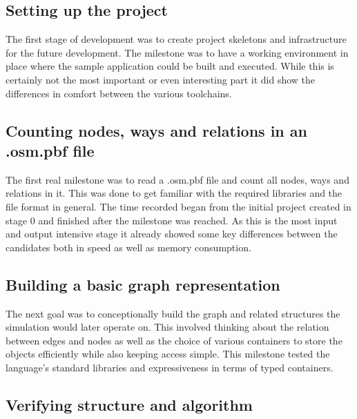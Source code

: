 \setcounter{subsection}{-1}

\subsection{Setting up the project}
\label{subsec:Approach::Implementation::Setup}

The first stage of development was to create project skeletons and infrastructure for the future development. The milestone was to have a working environment in place where the sample application could be built and executed. While this is certainly not the most important or even interesting part it did show the differences in comfort between the various toolchains.

\subsection{Counting nodes, ways and relations in an .osm.pbf file}
\label{subsec:Approach::Implementation::Counting}

The first real milestone was to read a .osm.pbf file and count all nodes, ways and relations in it. This was done to get familiar with the required libraries and the file format in general. The time recorded began from the initial project created in stage 0 and finished after the milestone was reached. As this is the most input and output intensive stage it already showed some key differences between the candidates both in speed as well as memory consumption.

\subsection{Building a basic graph representation}
\label{subsec:Approach::Implementation::Graph_Representation}

The next goal was to conceptionally build the graph and related structures the simulation would later operate on. This involved thinking about the relation between edges and nodes as well as the choice of various containers to store the objects efficiently while also keeping access simple. This milestone tested the language's standard libraries and expressiveness in terms of typed containers.

\subsection{Verifying structure and algorithm}
\label{subsec:Approach::Implementation::Verification}

